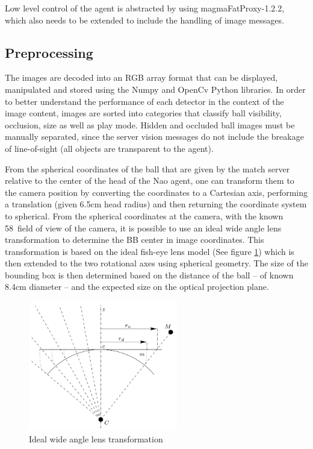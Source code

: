 \documentclass[a4paper,twoside,12pt]{report}
\begin{document}
Low level control of the agent is abstracted by using magmaFatProxy-1.2.2, which also needs to be extended to include the handling of image messages.

\subsection{Preprocessing}

The images are decoded into an RGB array format that can be displayed, manipulated and stored using the Numpy and OpenCv Python libraries. In order to better understand the performance of each detector in the context of the image content, images are sorted into categories that classify ball visibility, occlusion, size as well as play mode. Hidden and occluded ball images must be manually separated, since the server vision messages do not include the breakage of line-of-sight (all objects are transparent to the agent).

From the spherical coordinates of the ball that are given by the match server relative to the center of the head of the Nao agent, one can transform them to the camera position by converting the coordinates to a Cartesian axis, performing a translation (given 6.5cm head radius) and then returning the coordinate system to spherical. From the spherical coordinates at the camera, with the known 58\textdegree\ field of view of the camera, it is possible to use an ideal wide angle lens transformation to determine the BB center in image coordinates. This transformation is based on the ideal fish-eye lens model (See figure \ref{fig:wideangle}) which is then extended to the two rotational axes using spherical geometry. The size of the bounding box is then determined based on the distance of the ball -- of known 8.4cm diameter -- and the expected size on the optical projection plane.

\begin{figure}[h!]
\begin{center}
\includegraphics[width=6.5cm]{images/FOVmodel.jpg}
\caption{Ideal wide angle lens transformation \citep{wideangle} }
\label{fig:wideangle}
\end{center}
\end{figure}
\end{document}

